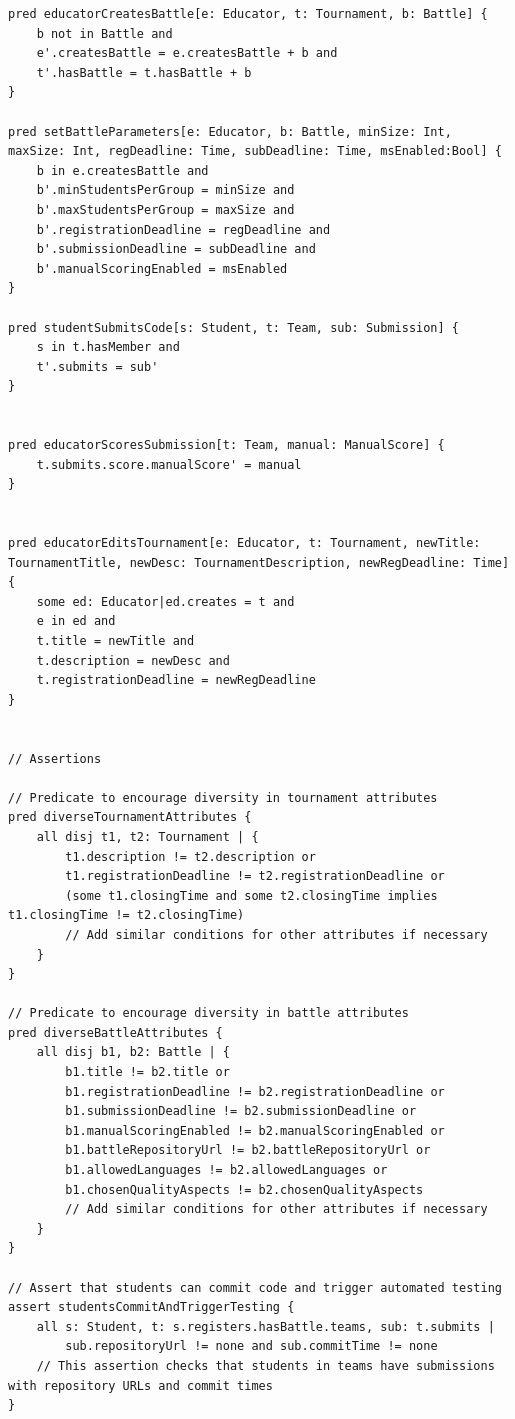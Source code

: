 \begin{lstlisting}[language=alloy]
pred educatorCreatesBattle[e: Educator, t: Tournament, b: Battle] {
    b not in Battle and
    e'.createsBattle = e.createsBattle + b and
    t'.hasBattle = t.hasBattle + b
}

pred setBattleParameters[e: Educator, b: Battle, minSize: Int, maxSize: Int, regDeadline: Time, subDeadline: Time, msEnabled:Bool] {
    b in e.createsBattle and
    b'.minStudentsPerGroup = minSize and
    b'.maxStudentsPerGroup = maxSize and
    b'.registrationDeadline = regDeadline and
    b'.submissionDeadline = subDeadline and
    b'.manualScoringEnabled = msEnabled
}

pred studentSubmitsCode[s: Student, t: Team, sub: Submission] {
    s in t.hasMember and
    t'.submits = sub'
}


pred educatorScoresSubmission[t: Team, manual: ManualScore] {
    t.submits.score.manualScore' = manual
}


pred educatorEditsTournament[e: Educator, t: Tournament, newTitle: TournamentTitle, newDesc: TournamentDescription, newRegDeadline: Time] {
    some ed: Educator|ed.creates = t and
    e in ed and
    t.title = newTitle and
    t.description = newDesc and
    t.registrationDeadline = newRegDeadline
}


// Assertions

// Predicate to encourage diversity in tournament attributes
pred diverseTournamentAttributes {
    all disj t1, t2: Tournament | {
        t1.description != t2.description or
        t1.registrationDeadline != t2.registrationDeadline or
        (some t1.closingTime and some t2.closingTime implies t1.closingTime != t2.closingTime)
        // Add similar conditions for other attributes if necessary
    }
}

// Predicate to encourage diversity in battle attributes
pred diverseBattleAttributes {
    all disj b1, b2: Battle | {
        b1.title != b2.title or
        b1.registrationDeadline != b2.registrationDeadline or
        b1.submissionDeadline != b2.submissionDeadline or
        b1.manualScoringEnabled != b2.manualScoringEnabled or
        b1.battleRepositoryUrl != b2.battleRepositoryUrl or
        b1.allowedLanguages != b2.allowedLanguages or
        b1.chosenQualityAspects != b2.chosenQualityAspects
        // Add similar conditions for other attributes if necessary
    }
}

// Assert that students can commit code and trigger automated testing
assert studentsCommitAndTriggerTesting {
    all s: Student, t: s.registers.hasBattle.teams, sub: t.submits |
        sub.repositoryUrl != none and sub.commitTime != none
    // This assertion checks that students in teams have submissions with repository URLs and commit times
}



\end{lstlisting}

